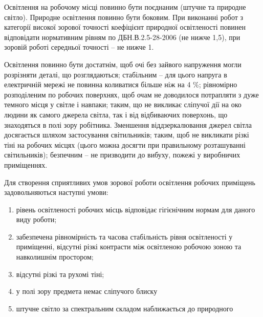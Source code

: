 Освітлення на робочому місці повинно бути поєднаним (штучне та природне світло). 
Природне освітлення повинно бути боковим. При виконанні робот з категорії високої 
зорової точності коефіцієнт природної освітленості повинен відповідати нормативним 
рівням по ДБН.В.2.5-28-2006 (не нижче 1,5), при зоровій роботі середньої точності – не нижче 1.

Освітлення повинно бути достатнім, щоб очі без зайвого напруження могли розрізняти деталі, що розглядаються; стабільним – для цього напруга в електричній мережі не повинна коливатися більше ніж на 4 \%; рівномірно розподіленим по робочих поверхнях, щоб очам не доводилося потрапляти з дуже темного місця у світле і навпаки; таким, що не викликає сліпучої дії на око людини як самого джерела світла, так і від відбиваючих поверхонь, що знаходяться в полі зору робітника. 
Зменшення віддзеркалювання джерел світла досягається шляхом застосування світильників; 
таким, щоб не викликати різкі тіні на робочих місцях (цього можна досягти при правильному розташуванні світильників); 
безпечним – не призводити до вибуху, пожежі у виробничих приміщеннях.

Для створення сприятливих умов зорової роботи освітлення робочих приміщень задовольняються наступні умови:
\begin{enumerate}
 \item рівень освітленості робочих місць відповідає гігієнічним нормам для даного виду роботи;
 \item забезпечена рівномірність та часова стабільність рівня освітленості у приміщенні, відсутні різкі контрасти між освітленою робочою зоною та навколишнім простором;
 \item відсутні різкі та рухомі тіні;
 \item у полі зору предмета немає сліпучого блиску
 \item штучне світло за спектральним складом наближається до природного
\end{enumerate}


